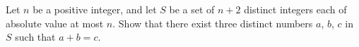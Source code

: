 Let $n$ be a positive integer, and let $S$ be a set of $n+2$ distinct integers each of absolute value at most $n$. Show that there exist three distinct numbers $a$, $b$, $c$ in $S$ such that $a+b=c$.